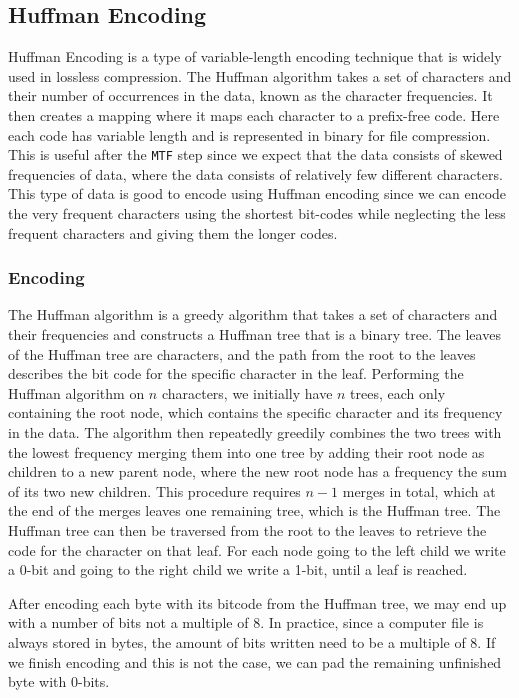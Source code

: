 \documentclass{article}
\begin{document}
\subsection{Huffman Encoding}\label{sectionHuff}
Huffman Encoding is a type of variable-length encoding technique that is widely used in lossless compression. The Huffman algorithm takes a set of characters and their number of occurrences in the data, known as the character frequencies. It then creates a mapping where it maps each character to a prefix-free code. Here each code has variable length and is represented in binary for file compression.
This is useful after the \texttt{MTF} step since we expect that the data consists of skewed frequencies of data, where the data consists of relatively few different characters. This type of data is good to encode using Huffman encoding since we can encode the very frequent characters using the shortest bit-codes while neglecting the less frequent characters and giving them the longer codes. 

\subsubsection{Encoding}
The Huffman algorithm is a greedy algorithm that takes a set of characters and their frequencies and constructs a Huffman tree that is a binary tree. The leaves of the Huffman tree are characters, and the path from the root to the leaves describes the bit code for the specific character in the leaf. 
Performing the Huffman algorithm on \(n\) characters, we initially have \(n\) trees, each only containing the root node, which contains the specific character and its frequency in the data. 
The algorithm then repeatedly greedily combines the two trees with the lowest frequency merging them into one tree by adding their root node as children to a new parent node, where the new root node has a frequency the sum of its two new children. This procedure requires \(n - 1\) merges in total, which at the end of the merges leaves one remaining tree, which is the Huffman tree.
The Huffman tree can then be traversed from the root to the leaves to retrieve the code for the character on that leaf. For each node going to the left child we write a 0-bit and going to the right child we write a 1-bit, until a leaf is reached.

After encoding each byte with its bitcode from the Huffman tree, we may end up with a number of bits not a multiple of 8. In practice, since a computer file is always stored in bytes, the amount of bits written need to be a multiple of 8. If we finish encoding and this is not the case, we can pad the remaining unfinished byte with 0-bits.
\end{document}
